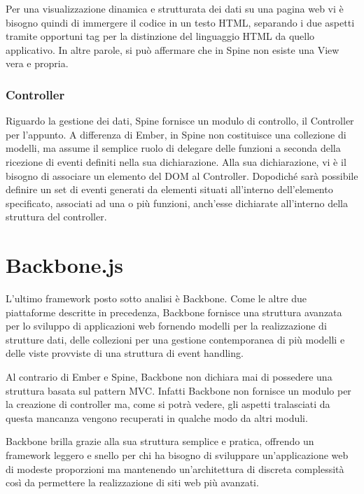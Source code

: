 Per una visualizzazione dinamica e strutturata dei dati su una pagina web vi è bisogno quindi di immergere il codice in un testo HTML, separando i due aspetti tramite opportuni tag per la distinzione del linguaggio HTML da quello applicativo.
In altre parole, si può affermare che in Spine non esiste una View vera e propria.

\subsubsection{Controller} %
\label{ssub:spine_controller}

Riguardo la gestione dei dati, Spine fornisce un modulo di controllo, il Controller per l'appunto. A differenza di Ember, in Spine non costituisce una collezione di modelli, ma assume il semplice ruolo di delegare delle funzioni a seconda della ricezione di eventi definiti nella sua dichiarazione. Alla sua dichiarazione, vi è il bisogno di associare un elemento del DOM al Controller. Dopodiché sarà possibile definire un set di eventi generati da elementi situati all'interno dell'elemento specificato, associati ad una o più funzioni, anch'esse dichiarate all'interno della struttura del controller.

\newpage

\section{Backbone.js} %
\label{sec:backbone_js}

L'ultimo framework posto sotto analisi è Backbone. Come le altre due piattaforme descritte in precedenza, Backbone fornisce una struttura avanzata per lo sviluppo di applicazioni web fornendo modelli per la realizzazione di strutture dati, delle collezioni per una gestione contemporanea di più modelli e delle viste provviste di una struttura di event handling.

Al contrario di Ember e Spine, Backbone non dichiara mai di possedere una struttura basata sul pattern MVC. Infatti Backbone non fornisce un modulo per la creazione di controller ma, come si potrà vedere, gli aspetti tralasciati da questa mancanza vengono recuperati in qualche modo da altri moduli.

Backbone brilla grazie alla sua struttura semplice e pratica, offrendo un framework leggero e snello per chi ha bisogno di sviluppare un'applicazione web di modeste proporzioni ma mantenendo un'architettura di discreta complessità così da permettere la realizzazione di siti web più avanzati.

